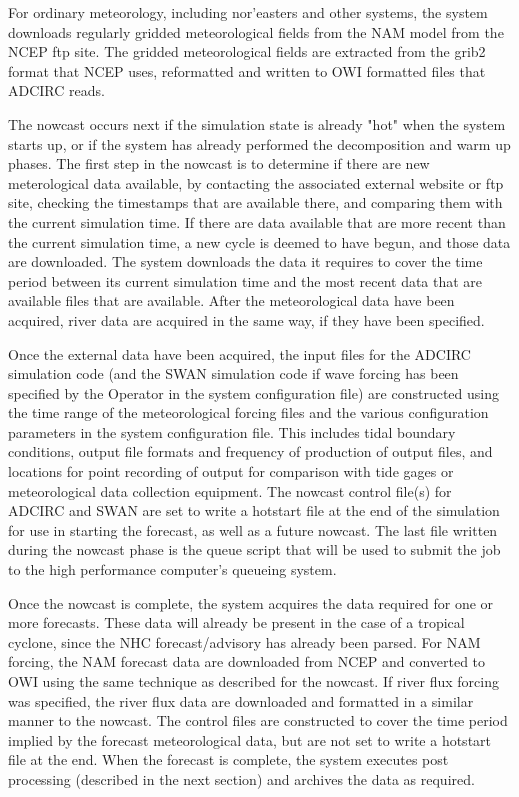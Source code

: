 \documentclass[12pt]{article}
\begin{document}
For ordinary meteorology, including nor'easters and other 
systems, the system downloads regularly gridded meteorological 
fields from the NAM model from the NCEP ftp site. The gridded 
meteorological fields are extracted from the grib2 format that NCEP 
uses, reformatted and written to OWI formatted files that ADCIRC 
reads. 

The nowcast occurs next if the simulation state is already "hot" 
when the system starts up, or if the system has already performed 
the decomposition and warm up phases. The first step in the nowcast 
is to determine if there are new meterological data available, by 
contacting the associated external website or ftp site, checking the 
timestamps that are available there, and comparing them with the 
current simulation time. If there are data available that are more 
recent than the current simulation time, a new cycle is deemed to 
have begun, and those data are downloaded. The system downloads the 
data it requires to cover the time period between its current 
simulation time and the most recent data that are available files 
that are available. After the meteorological data have been 
acquired, river data are acquired in the same way, if they have been 
specified. 

Once the external data have been acquired, the input files for the 
ADCIRC simulation code (and the SWAN simulation code if wave forcing 
has been specified by the Operator in the system configuration file) 
are constructed using the time range of the meteorological forcing 
files and the various configuration parameters in the system 
configuration file. This includes tidal boundary conditions, output 
file formats and frequency of production of output files, and 
locations for point recording of output for comparison with tide 
gages or meteorological data collection equipment. The nowcast 
control file(s) for ADCIRC and SWAN are set to write a hotstart file 
at the end of the simulation for use in starting the forecast, as 
well as a future nowcast. The last file written during the nowcast 
phase is the queue script that will be used to submit the job to the 
high performance computer's queueing system.

Once the nowcast is complete, the system acquires the data required 
for one or more forecasts. These data will already be present in the 
case of a tropical cyclone, since the NHC forecast/advisory has 
already been parsed. For NAM forcing, the NAM forecast data are 
downloaded from NCEP and converted to OWI using the same technique 
as described for the nowcast. If river flux forcing was specified, 
the river flux data are downloaded and formatted in a similar manner 
to the nowcast. The control files are constructed to cover the time 
period implied by the forecast meteorological data, but are not set 
to write a hotstart file at the end. When the forecast is complete, 
the system executes post processing (described in the next section) 
and archives the data as required. 
\end{document}
